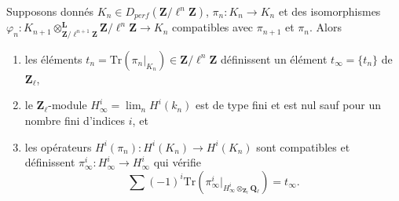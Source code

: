 \begin{lemma}
\label{lemma-piece-together}
Supposons donnés
$K_n\in D_{perf}(\mathbf{Z}/\ell^n\mathbf{Z})$, $\pi_n : K_n\to K_n$
et des isomorphismes
$\varphi_n :
K_{n+1} \otimes^\mathbf{L}_{\mathbf{Z}/\ell^{n+1}\mathbf{Z}}
\mathbf{Z}/\ell^n\mathbf{Z}
\to K_n$
compatibles avec $\pi_{n+1}$ et $\pi_n$. Alors
\begin{enumerate}
\item
les éléments $t_n = \text{Tr}(\pi_n |_{K_n})\in \mathbf{Z}/\ell^n\mathbf{Z}$
définissent un élément $t_\infty = \{t_n\}$ de $\mathbf{Z}_\ell$,
\item
le $\mathbf{Z}_\ell$-module $H_\infty^i = \lim_n H^i(k_n)$ est de type fini et
est nul sauf pour un nombre fini d'indices $i$, et
\item
les opérateurs $H^i(\pi_n): H^i(K_n)\to H^i(K_n)$ sont compatibles et définissent
$\pi_\infty^i : H_\infty^i\to H_\infty^i$ qui vérifie
$$
\sum (-1)^i \text{Tr}(
\pi_\infty^i |_{H_\infty^i \otimes_{\mathbf{Z}_\ell}\mathbf{Q}_\ell}) =
t_\infty.
$$
\end{enumerate}
\end{lemma}

